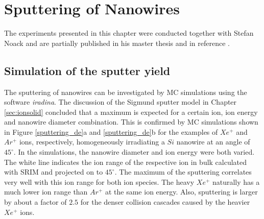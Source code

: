 \chapter{Sputtering of Nanowires}
\label{sec:sputter}

The experiments presented in this chapter were conducted together with Stefan Noack and are partially published in his master thesis \cite{noack_sputter_2014} and in reference \cite{johannes_anomalous_2015}.




\section{Simulation of the sputter yield}
\label{sec:simsputering}

The sputtering of nanowires can be investigated by MC simulations using the software \emph{iradina}. The discussion of the Sigmund sputter model in Chapter \ref{sec:ionsolid} concluded that a maximum is expected for a certain ion, ion energy and nanowire diameter combination. This is confirmed by MC simulations shown in Figure \ref{sputtering_de}a and \ref{sputtering_de}b for the examples of $Xe^+$ and $Ar^+$ ions, respectively, homogeneously irradiating a $Si$ nanowire at an angle of $45^\circ$. In the simulations, the nanowire diameter and ion energy were both varied. The white line indicates the ion range of the respective ion in bulk calculated with SRIM and projected on to $45^\circ$. The maximum of the sputtering correlates very well with this ion range for both ion species. The heavy $Xe^+$ naturally has a much lower ion range than $Ar^+$ at the same ion energy. Also, sputtering is larger by about a factor of $2.5$ for the denser collision cascades caused by the heavier $Xe^+$ ions.

